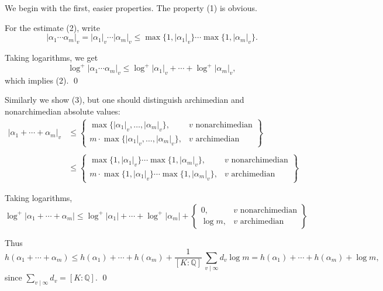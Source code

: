 \documentclass{article}
\newcommand{\QQ}{\mathbb{Q}}
\theoremstyle{myplain}
\theoremstyle{mydefinition}
\begin{document}
We begin with the first, easier properties. The property (1) is obvious.

\vspace{1em}

For the estimate (2), write
\[ |\alpha_1 \cdots \alpha_m|_v = |\alpha_1|_v \cdots |\alpha_m|_v \le
  \max \{ 1, |\alpha_1|_v \} \cdots \max \{ 1, |\alpha_m|_v \}. \]

Taking logarithms, we get
$$\log^+ |\alpha_1\cdots\alpha_m|_v \le \log^+ |\alpha_1|_v + \cdots + \log^+ |\alpha_m|_v,$$
which implies (2). \qed

\vspace{1em}

Similarly we show (3), but one should distinguish archimedian and nonarchimedian
absolute values:
\begin{align*}
  |\alpha_1 + \cdots + \alpha_m|_v & \le \left\{ \begin{array}{ll}
                                                   \max \{ |\alpha_1|_v, \ldots, |\alpha_m|_v \}, & v \text{ nonarchimedian}\\
                                                   m \cdot \max \{ |\alpha_1|_v, \ldots, |\alpha_m|_v \}, & v \text{ archimedian}
                                                 \end{array} \right\} \\
  \\
                                   & \le \left\{ \begin{array}{ll}
                                                   \max \{ 1, |\alpha_1|_v \} \cdots \max \{1, |\alpha_m|_v \}, & v \text{ nonarchimedian}\\
                                                   m \cdot \max \{ 1, |\alpha_1|_v \} \cdots \max \{1, |\alpha_m|_v \}, & v \text{ archimedian}
                                                 \end{array} \right\}
\end{align*}

Taking logarithms,
\[ \log^+ |\alpha_1 + \cdots + \alpha_m| \le
  \log^+ |\alpha_1| + \cdots + \log^+ |\alpha_m|
  + \left\{ \begin{array}{ll}
              0, & v \text{ nonarchimedian}\\
              \log m, & v \text{ archimedian}
            \end{array} \right\} \]

Thus
\[ h (\alpha_1 + \cdots + \alpha_m) \le
  h (\alpha_1) + \cdots + h (\alpha_m) +
  \frac{1}{[K:\QQ]} \, \sum_{v \mid \infty} d_v \log m =
  h (\alpha_1) + \cdots + h (\alpha_m) + \log m, \]
since $\sum_{v \mid \infty} d_v = [K : \QQ]$. \qed
\end{document}
